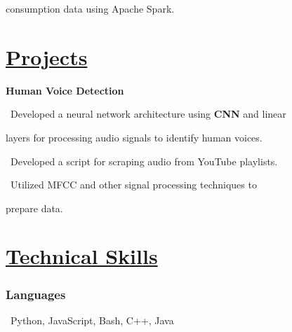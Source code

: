 \documentclass{article}
\begin{document}
\begin{minipage}[t][0pt]{8in\linewidth}
\begin{minipage}[t]{0.45\textwidth\hspace{0in}}
\begin{minipage}[t]{3.75in\textwidth\hspace{0in}}
            \hspace{1.6em} consumption data using Apache Spark.
        \end{minipage}

        \vspace{-0.3em}
        \section{\underline{Projects}}
        \begin{minipage}[t]{3.75in\textwidth\hspace{0in}}
            \mdseries\bfseries{Human Voice Detection}            
            
            \vspace{0.6em}
            \small\mdseries
            \hspace{1em}\textasteriskcentered \, \mdseries\textrm{Developed a neural network architecture using \textbf{CNN} and linear} 
            
            \hspace{2em}layers for processing audio signals to identify human voices.

            \vspace{0.6em}
            \hspace{1em}\textasteriskcentered \, \mdseries\textrm{Developed a script for scraping audio from YouTube playlists.}
            
            \vspace{0.6em}
            \hspace{1em}\textasteriskcentered \, \mdseries\textrm{Utilized MFCC and other signal processing techniques to} 
            
            \hspace{1.7em} prepare data.

        \end{minipage}

\end{minipage}
    \begin{minipage}[t]{3.1in\linewidth\hspace{2.8em}}
    \section{\underline{Technical Skills}}
    \vspace{-0.7em}
    \subsubsection{Languages}
    \, Python, JavaScript, Bash, C++, Java
    \vspace{0.3em}


\end{minipage}
\end{minipage}
\end{document}
